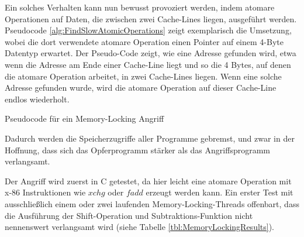 Ein solches Verhalten kann nun bewusst provoziert werden, indem atomare Operationen auf Daten, die zwischen zwei Cache-Lines liegen, ausgeführt werden. Pseudocode \ref{alg:FindSlowAtomicOperations} zeigt exemplarisch die Umsetzung, wobei die dort verwendete atomare Operation einen Pointer auf einem 4-Byte Datentyp erwartet. 
Der Pseudo-Code zeigt, wie eine Adresse gefunden wird, etwa wenn die Adresse am Ende einer Cache-Line liegt und so die 4 Bytes, auf denen die atomare Operation arbeitet, in zwei Cache-Lines liegen. 
Wenn eine solche Adresse gefunden wurde, wird die atomare Operation auf dieser Cache-Line endlos wiederholt.

\begin{algorithm}[h]
\DontPrintSemicolon
\caption{Pseudocode für ein Memory-Locking Angriff}
\label{alg:FindSlowAtomicOperations}

\end{algorithm}

Dadurch werden die Speicherzugriffe aller Programme gebremst, und zwar in der Hoffnung, dass sich das Opferprogramm stärker als das Angriffsprogramm verlangsamt.

Der Angriff wird zuerst in C getestet, da hier leicht eine atomare Operation mit x-86 Instruktionen wie $xchg$ oder $fadd$ erzeugt werden kann.
Ein erster Test mit ausschließlich einem oder zwei laufenden Memory-Locking-Threads offenbart, dass die Ausführung der Shift-Operation und Subtraktions-Funktion nicht nennenswert verlangsamt wird (siehe Tabelle \ref{tbl:MemoryLockingResults}).

